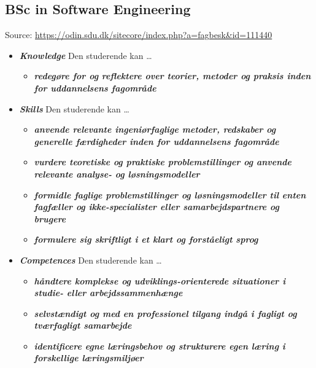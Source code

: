 \documentclass[a4paper, oneside]{memoir}
\newcommand{\textdesc}[1]{\textit{\textbf{#1}}}
\newcommand{\descitem}[1]{\item \textdesc{#1}}
\begin{document}
\subsection{BSc in Software Engineering}
Source: \url{https://odin.sdu.dk/sitecore/index.php?a=fagbesk&id=111440}
\begin{itemize}
  \descitem{Knowledge} Den studerende kan \ldots
    \begin{itemize}
      \descitem{redegøre for og reflektere over teorier, metoder og praksis inden for uddannelsens fagområde}
    \end{itemize}
  \descitem{Skills} Den studerende kan \ldots
    \begin{itemize}
      \descitem{anvende relevante ingeniørfaglige metoder, redskaber og generelle færdigheder inden for uddannelsens fagområde}
      \descitem{vurdere teoretiske og praktiske problemstillinger og anvende relevante analyse- og løsningsmodeller}
      \descitem{formidle faglige problemstillinger og løsningsmodeller til enten fagfæller og ikke-specialister eller samarbejdspartnere og brugere}
      \descitem{formulere sig skriftligt i et klart og forståeligt sprog}
    \end{itemize}
  \descitem{Competences} Den studerende kan \ldots
    \begin{itemize}
      \descitem{håndtere komplekse og udviklings-orienterede situationer i studie- eller arbejdssammenhænge}
      \descitem{selvstændigt og med en professionel tilgang indgå i fagligt og tværfagligt samarbejde}
      \descitem{identificere egne læringsbehov og strukturere egen læring i forskellige læringsmiljøer}
    \end{itemize}
\end{itemize}

\end{document}
